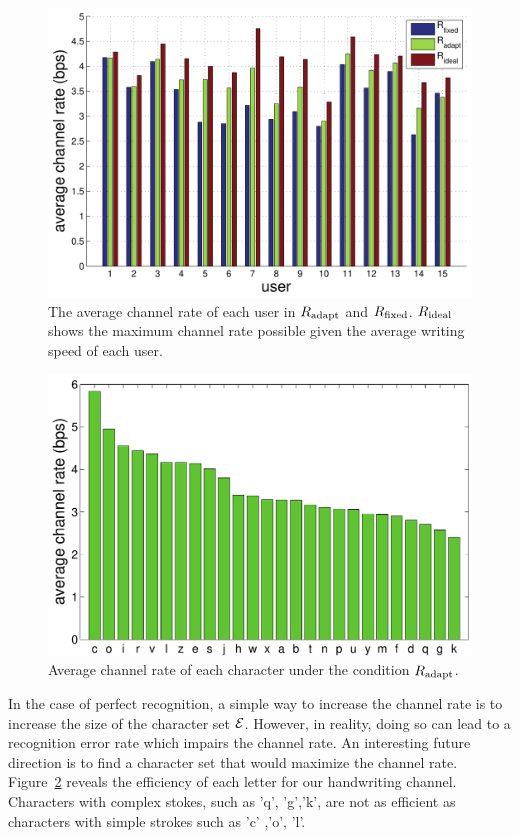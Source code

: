\documentclass{sigchi}
\begin{document}
\begin{figure}[!t]
  \centering
  \includegraphics[width=.95\columnwidth]{figures/IUI_user_summary.pdf}   
  \caption{The average channel rate of each user in $R_{\mathrm{adapt}}$ and
    $R_{\mathrm{fixed}}$. $R_{\mathrm{ideal}}$ shows the maximum channel rate possible given the
    average writing speed of each user. }
  \label{fig:channel_rate_per_user}
\end{figure}

\begin{figure}[!t]
  \centering
  \includegraphics[width=0.9\columnwidth]{figures/histogram_channel_rate.pdf}
  \caption{Average channel rate of each character under the condition $R_{\mathrm{adapt}}$.}
  \label{fig:histogram_english_rate} 
\end{figure}

In the case of perfect recognition, a simple way to increase the
channel rate is to increase the size of the character set
$\mathcal{E}$. However, in reality, doing so can lead to a
recognition error rate which impairs the channel rate. An interesting
future direction is to find a character set that would maximize the channel
rate. Figure~\ref{fig:histogram_english_rate} reveals the efficiency of each
letter for our handwriting channel. Characters with complex stokes,
such as 'q', 'g','k', are not as efficient as characters with simple
strokes such as 'c' ,'o', 'l'. 
\end{document}
